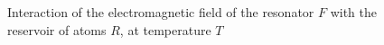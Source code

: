 \begin{figure}
\centering



\caption{Interaction of the electromagnetic field of the resonator $F$ with
  the reservoir of atoms $R$, at temperature $T$}
\label{figPart1Ch2_7}
\end{figure}